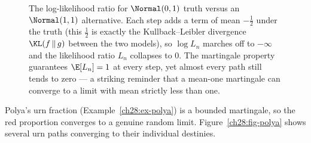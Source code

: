 \begin{figure}[H]
\centering
{}
\caption{The log-likelihood ratio for $\Normal(0,1)$ truth versus an $\Normal(1,1)$ alternative. Each
step adds a term of mean $-\tfrac12$ under the truth (this $\tfrac12$ is exactly the Kullback--Leibler
divergence $\KL(f\,\|\,g)$ between the two models), so $\log L_n$ marches off to $-\infty$ and the
likelihood ratio $L_n$ collapses to $0$. The martingale property guarantees $\E[L_n] = 1$ at every
step, yet almost every path still tends to zero --- a striking reminder that a mean-one martingale can
converge to a limit with mean strictly less than one.}
\label{ch28:fig-lr}
\end{figure}

Polya's urn fraction
(Example~\ref{ch28:ex-polya}) is a bounded martingale, so the red proportion converges to a genuine
random limit. Figure~\ref{ch28:fig-polya} shows several urn paths converging to their individual
destinies.

